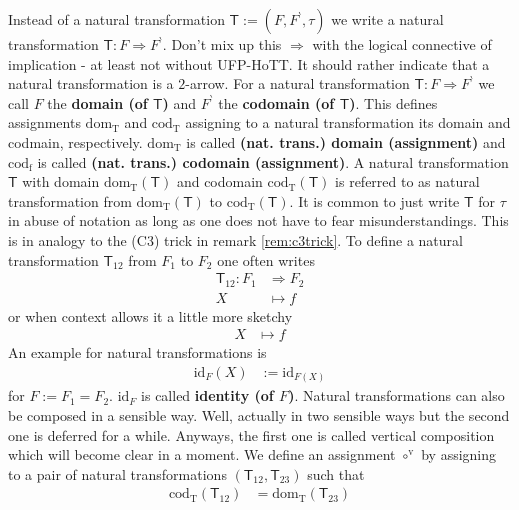 Instead of {\glqq}a natural transformation $\mathsf{T} := (F,F^{\backprime},\tau)${\grqq} we write {\glqq}a natural transformation $\mathsf{T} \colon F \Rightarrow F^{\backprime}${\grqq}. Don't mix up this $\Rightarrow$ with the logical connective of implication - at least not without UFP-HoTT. It should rather indicate that a natural transformation is a $2$-arrow. For a natural transformation $\mathsf{T} \colon F \Rightarrow F^{\backprime}$ we call $F$ the \textbf{domain (of $\mathsf{T}$)} and $F^{\backprime}$ the \textbf{codomain (of $\mathsf{T}$)}. This defines assignments $\mathrm{dom_{T}}$ and $\mathrm{cod_{T}}$ assigning to a natural transformation its domain and codmain, respectively. $\mathrm{dom_{T}}$ is called \textbf{(nat. trans.) domain (assignment)} and $\mathrm{cod_{f}}$ is called \textbf{(nat. trans.) codomain (assignment)}. A natural transformation $\mathsf{T}$ with domain $\mathrm{dom_{T}}(\mathsf{T})$ and codomain $\mathrm{cod_{T}}(\mathsf{T})$ is referred to as natural transformation from $\mathrm{dom_{T}}(\mathsf{T})$ to $\mathrm{cod_{T}}(\mathsf{T})$. It is common to just write $\mathsf{T}$ for $\tau$ in abuse of notation as long as one does not have to fear misunderstandings. This is in analogy to the (C3) trick in remark \ref{rem:c3trick}. To define a natural transformation $\mathsf{T}_{12}$ from $F_{1}$ to $F_{2}$ one often writes
\begin{align*}
  \mathsf{T}_{12}
  \colon
  F_{1}
  &\Rightarrow
  F_{2}
  \\
  X
  &\mapsto
  f
\end{align*}
or when context allows it a little more sketchy
\begin{align*}
  X
  &\mapsto
  f
\end{align*}
An example for natural transformations is
\begin{align*}
  \mathrm{id}_{F}(X)
  &:=
  \mathrm{id}_{F(X)}
\end{align*}
for $F := F_{1} = F_{2}$. $\mathrm{id}_{F}$ is called \textbf{identity (of $F$)}. Natural transformations can also be composed in a sensible way. Well, actually in two sensible ways but the second one is deferred for a while. Anyways, the first one is called vertical composition which will become clear in a moment. We define an assignment $\circ^{\textrm{v}}$ by assigning to a pair of natural transformations $(\mathsf{T}_{12},\mathsf{T}_{23})$ such that
\begin{align*}
  \mathrm{cod_{T}}(\mathsf{T}_{12})
  &=
  \mathrm{dom_{T}}(\mathsf{T}_{23})
\end{align*}

